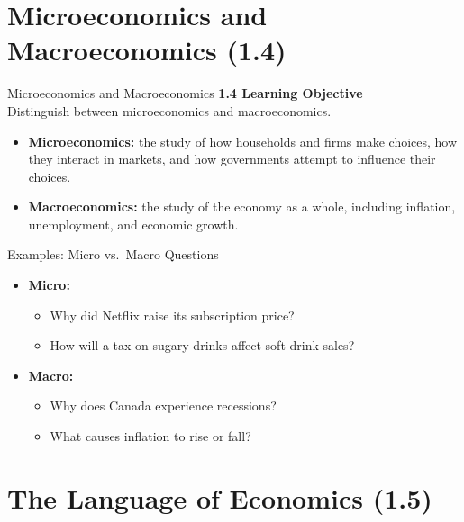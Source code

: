 \documentclass[aspectratio=169]{beamer}
\begin{document}
\section{Microeconomics and Macroeconomics (1.4)}

\begin{frame}{Microeconomics and Macroeconomics}
\transfade
\textbf{1.4 Learning Objective}\\[0.3em]
Distinguish between microeconomics and macroeconomics.
\begin{itemize}
  \item \textbf{Microeconomics:} the study of how households and firms make choices, how they interact in markets, and how governments attempt to influence their choices.
  \item \textbf{Macroeconomics:} the study of the economy as a whole, including inflation, unemployment, and economic growth.
\end{itemize}
\end{frame}

\begin{frame}{Examples: Micro vs.\ Macro Questions}
\transfade
\begin{itemize}
  \item \textbf{Micro:}
  \begin{itemize}
    \item Why did Netflix raise its subscription price?
    \item How will a tax on sugary drinks affect soft drink sales?
  \end{itemize}
  \item \textbf{Macro:}
  \begin{itemize}
    \item Why does Canada experience recessions?
    \item What causes inflation to rise or fall?
  \end{itemize}
\end{itemize}
\end{frame}



\section{The Language of Economics (1.5)}
\end{document}
